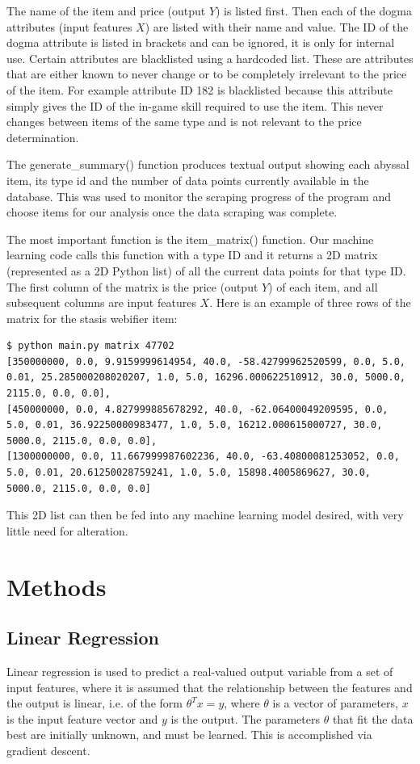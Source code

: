\documentclass[10pt]{article}
\begin{document}
	The name of the item and price (output $Y$) is listed first. Then each of the dogma attributes (input features $X$) are listed with their name and value. The ID of the dogma attribute is listed in brackets and can be ignored, it is only for internal use. Certain attributes are blacklisted using a hardcoded list. These are attributes that are either known to never change or to be completely irrelevant to the price of the item. For example attribute ID 182 is blacklisted because this attribute simply gives the ID of the in-game skill required to use the item. This never changes between items of the same type and is not relevant to the price determination.
	
	The generate\_summary() function produces textual output showing each abyssal item, its type id and the number of data points currently available in the database. This was used to monitor the scraping progress of the program and choose items for our analysis once the data scraping was complete.
	
	The most important function is the item\_matrix() function. Our machine learning code calls this function with a type ID and it returns a 2D matrix (represented as a 2D Python list) of all the current data points for that type ID. The first column of the matrix is the price (output $Y$) of each item, and all subsequent columns are input features $X$. Here is an example of three rows of the matrix for the stasis webifier item:
	
	\begin{lstlisting}
$ python main.py matrix 47702
[350000000, 0.0, 9.9159999614954, 40.0, -58.42799962520599, 0.0, 5.0, 0.01, 25.285000208020207, 1.0, 5.0, 16296.000622510912, 30.0, 5000.0, 2115.0, 0.0, 0.0], 
[450000000, 0.0, 4.827999885678292, 40.0, -62.06400049209595, 0.0, 5.0, 0.01, 36.92250000983477, 1.0, 5.0, 16212.000615000727, 30.0, 5000.0, 2115.0, 0.0, 0.0], 
[1300000000, 0.0, 11.667999987602236, 40.0, -63.40800081253052, 0.0, 5.0, 0.01, 20.61250028759241, 1.0, 5.0, 15898.4005869627, 30.0, 5000.0, 2115.0, 0.0, 0.0]
	\end{lstlisting}

	This 2D list can then be fed into any machine learning model desired, with very little need for alteration.
		
	
\section{Methods}
	\subsection{Linear Regression}
		Linear regression is used to predict a real-valued output variable from a set of input features, where it is assumed that the relationship between the features and the output is linear, i.e. of the form $\theta^{T}x = y$, where $\theta$ is a vector of parameters, $x$ is the input feature vector and $y$ is the output. The parameters $\theta$ that fit the data best are initially unknown, and must be learned. This is accomplished via gradient descent.
		
\end{document}
